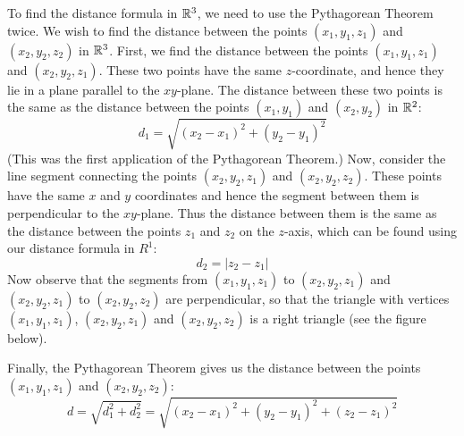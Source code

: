 \documentclass[handout]{ximera}
\begin{document}
To find the distance formula in $\mathbb R^3$, we need to use the Pythagorean Theorem twice.
We wish to find the distance between the points $(x_1, y_1, z_1)$ and $(x_2, y_2, z_2)$ in $\mathbb R^3$.
First, we find the distance between the points $(x_1, y_1, z_1)$ and $(x_2, y_2, z_1)$.  These two points have the same $z$-coordinate, and hence they lie
in a plane parallel to the $xy$-plane.  The distance between these two points is the same as the distance between the points $(x_1, y_1)$ and $(x_2, y_2)$
in $\mathbb R^2$:
\[
d_1 = \sqrt{(x_2 -x_1)^2 + (y_2 - y_1)^2}
\]
(This was the first application of the Pythagorean Theorem.) Now, consider the line segment connecting the points $(x_2, y_2, z_1)$  and $(x_2, y_2, z_2)$.
These points have the same $x$ and $y$ coordinates and hence the segment between them is perpendicular to the $xy$-plane. 
Thus the distance between them is the same as the distance between the points $z_1$ and $z_2$ on the $z$-axis, which can be found using our distance formula in $R^1$:
\[
d_2 = |z_2 -z_1|
\]
Now observe that the segments from $(x_1, y_1, z_1)$ to $(x_2, y_2, z_1)$ and $(x_2, y_2, z_1)$ to $(x_2, y_2, z_2)$ are perpendicular, 
so that the triangle with vertices $(x_1, y_1, z_1)$, $(x_2, y_2, z_1)$ and $(x_2, y_2, z_2)$ is a right triangle (see the figure below).





\begin{image}
\end{image}

Finally, the Pythagorean Theorem gives us the distance between the points $(x_1, y_1, z_1)$ and $(x_2, y_2, z_2)$:
\[
d = \sqrt{d_1^2 +d_2^2} = \sqrt{(x_2 -x_1)^2+(y_2 -y_1)^2+(z_2 -z_1)^2}
\]
\end{document}
